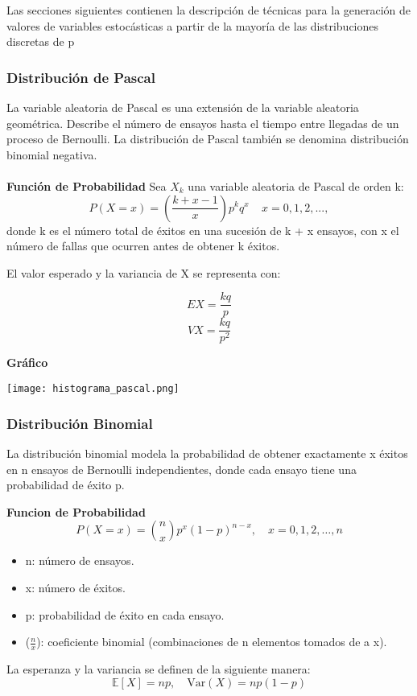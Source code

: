 \documentclass[11pt]{article}
\begin{document}
Las secciones siguientes contienen la descripción de técnicas para la generación de valores de variables estocásticas a partir de la mayoría de las distribuciones discretas de p

\subsubsection{Distribución de Pascal}
La variable aleatoria de Pascal es una extensión de la variable aleatoria geométrica. Describe el número de ensayos hasta el tiempo entre llegadas de un proceso de Bernoulli. La distribución de Pascal también se denomina distribución binomial negativa.
\\ \\
\noindent\textbf{Función de Probabilidad\newline}
Sea $X_k$ una variable aleatoria de Pascal de orden k:
 \begin{equation}
    P(X = x) = (\frac{k+x-1}{x})p^{k}q^{x} \ \text{   } \ x = 0,1,2,...,
  \end{equation}
  donde k es el número total de éxitos en una sucesión de k + x ensayos, con x el número de fallas que ocurren antes de obtener k éxitos.

  El valor esperado y la variancia de X se representa con:

  \begin{equation}
    EX = \frac{kq}{p}
  \end{equation}
  \begin{equation}
    VX = \frac{kq}{p^2}
  \end{equation}

\noindent\textbf{Gráfico\newline}
\begin{center}
\texttt{[image: histograma\_pascal.png]}
\end{center}
  

\subsubsection{Distribución Binomial}
La distribución binomial modela la probabilidad de obtener exactamente x éxitos en n ensayos de Bernoulli independientes, donde cada ensayo tiene una probabilidad de éxito p.

\noindent\textbf{Funcion de Probabilidad\newline}
\[
P(X = x) = \binom{n}{x} p^x (1 - p)^{n - x}, \quad x = 0, 1, 2, \dots, n
\]
\begin{itemize}
    \item n: número de ensayos.
    \item x: número de éxitos.
    \item p: probabilidad de éxito en cada ensayo. 
    \item ($\frac{n}{x}$): coeficiente binomial (combinaciones de n elementos tomados de a x).
\end{itemize}
La esperanza y la variancia se definen de la siguiente manera:
\[
\mathbb{E}[X] = np, \quad \text{Var}(X) = np(1 - p)
\]
\end{document}
